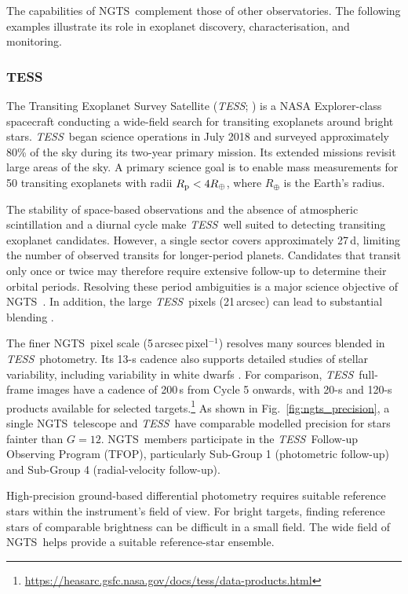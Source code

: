 \documentclass[fleqn,usenatbib]{mnras}
\newcommand{\ngts}{{NGTS}}
\newcommand{\tess}{{\it TESS}}
\begin{document}
The capabilities of \ngts\ complement those of other observatories. The following examples illustrate its role in exoplanet discovery, characterisation, and monitoring.

\subsubsection{TESS}
\label{sec:tess}

The Transiting Exoplanet Survey Satellite (\tess; \citealt{Ricker15}) is a NASA Explorer-class spacecraft conducting a wide-field search for transiting exoplanets around bright stars. \tess\ began science operations in July 2018 and surveyed approximately 80\% of the sky during its two-year primary mission. Its extended missions revisit large areas of the sky. A primary science goal is to enable mass measurements for 50 transiting exoplanets with radii $R_{\rm p}<4R_{\oplus}$, where $R_{\oplus}$ is the Earth's radius.

The stability of space-based observations and the absence of atmospheric scintillation and a diurnal cycle make \tess\ well suited to detecting transiting exoplanet candidates. However, a single sector covers approximately 27\,d, limiting the number of observed transits for longer-period planets. Candidates that transit only once or twice may therefore require extensive follow-up to determine their orbital periods. Resolving these period ambiguities is a major science objective of \ngts\ \citep{2020MNRAS.491.1548G,2020ApJ...898L..11G,2022MNRAS.513.1785G,2024MNRAS.532.1444G}. In addition, the large \tess\ pixels (21\,arcsec) can lead to substantial blending \citep{2015ApJ...809...77S}.

The finer \ngts\ pixel scale (5\,arcsec\,pixel$^{-1}$) resolves many sources blended in \tess\ photometry. Its 13-s cadence also supports detailed studies of stellar variability, including variability in white dwarfs \citep[e.g.][]{2021MNRAS.502..581C}. For comparison, \tess\ full-frame images have a cadence of 200\,s from Cycle 5 onwards, with 20-s and 120-s products available for selected targets.\footnote{\url{https://heasarc.gsfc.nasa.gov/docs/tess/data-products.html}} As shown in Fig.~\ref{fig:ngts_precision}, a single \ngts\ telescope and \tess\ have comparable modelled precision for stars fainter than $G=12$. \ngts\ members participate in the \tess\ Follow-up Observing Program (TFOP), particularly Sub-Group 1 (photometric follow-up) and Sub-Group 4 (radial-velocity follow-up).

High-precision ground-based differential photometry requires suitable reference stars within the instrument's field of view. For bright targets, finding reference stars of comparable brightness can be difficult in a small field. The wide field of \ngts\ helps provide a suitable reference-star ensemble.
\end{document}
